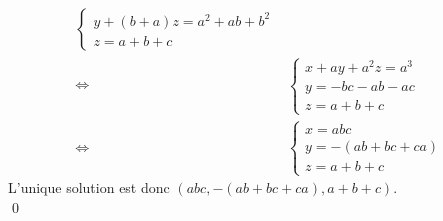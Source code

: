 \documentclass[10pt]{article}
\begin{document}
\begin{tcolorbox}[enhanced, width=7in, center, size=fbox, fontupper=\large, drop shadow southwest]
\begin{align*}
\begin{cases}
            y+(b+a)z=a^2+ab+b^2\\
            z =a + b + c
        \end{cases}
        \\\iff &
        \begin{cases}
            x+ay+a^2z=a^3\\
            y=-bc - ab - ac\\
            z = a + b + c
        \end{cases}
        \\\iff &
        \begin{cases}
            x=abc\\
            y=-(ab + bc + ca)\\
            z = a + b + c
        \end{cases}
    \end{align*}
    L'unique solution est donc $(abc, -(ab + bc + ca), a+b+c)$.\\
    \qed
\end{tcolorbox}

\end{document}
